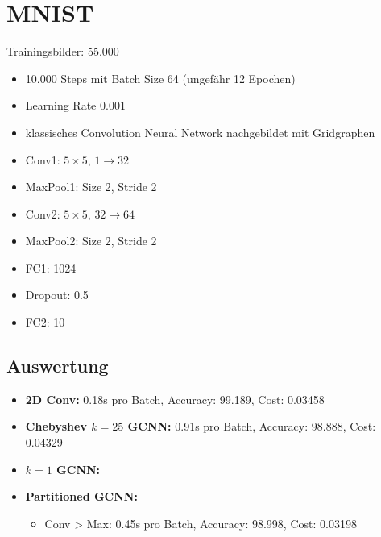 \section{MNIST}

Trainingsbilder: 55.000

\begin{itemize}
  \item 10.000 Steps mit Batch Size 64 (ungefähr 12 Epochen)
  \item Learning Rate 0.001 
  \item klassisches Convolution Neural Network nachgebildet mit Gridgraphen
  \item Conv1: $5 \times 5$, $1 \rightarrow 32$
  \item MaxPool1: Size 2, Stride 2
  \item Conv2: $5 \times 5$, $32 \rightarrow 64$
  \item MaxPool2: Size 2, Stride 2
  \item FC1: 1024
  \item Dropout: 0.5
  \item FC2: 10
\end{itemize}

\subsection{Auswertung}

\begin{itemize}
  \item \textbf{2D Conv:} 0.18s pro Batch, Accuracy: 99.189, Cost: 0.03458
  \item \textbf{Chebyshev $k=25$ GCNN:} 0.91s pro Batch, Accuracy: 98.888, Cost: 0.04329
  \item \textbf{$k=1$ GCNN:}
  \item \textbf{Partitioned GCNN:}
  \begin{itemize}
    \item Conv > Max: 0.45s pro Batch, Accuracy: 98.998, Cost: 0.03198
  \end{itemize}
\end{itemize}
